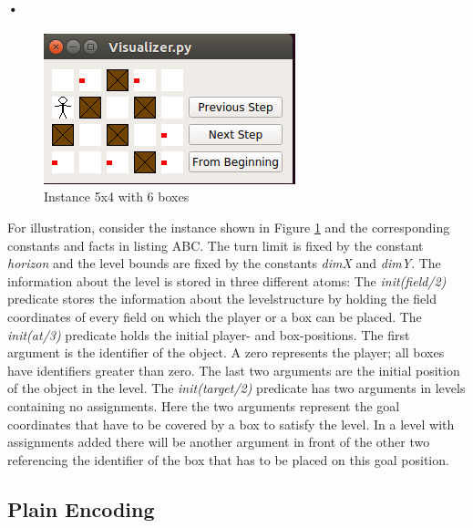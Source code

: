 \documentclass{report}
\begin{document}
\paragraph*{•}
\begin{figure}[h]
\centering
\includegraphics{Visualizer}
\caption{Instance 5x4 with 6 boxes}
\label{fig:levelVis}
\end{figure}

For illustration, consider the instance shown in Figure \ref{fig:levelVis} and the corresponding constants and facts in listing ABC. The turn limit is fixed by the constant \textit{horizon} and the level bounds are fixed by the constants \textit{dimX} and \textit{dimY}. The information about the level is stored in three different atoms:
The \textit{init(field/2)} predicate stores the information about the levelstructure by holding the field coordinates of every field on which the player or a box can be placed.
The \textit{init(at/3)} predicate holds the initial player- and box-positions. The first argument is the identifier of the object. A zero represents the player; all boxes have identifiers greater than zero. The last two arguments are the initial position of the object in the level.
The \textit{init(target/2)} predicate has two arguments in levels containing no assignments. Here the two arguments represent the goal coordinates that have to be covered by a box to satisfy the level. In a level with assignments added there will be another argument in front of the other two referencing the identifier of the box that has to be placed on this goal position.
\subsection{Plain Encoding}
\end{document}
